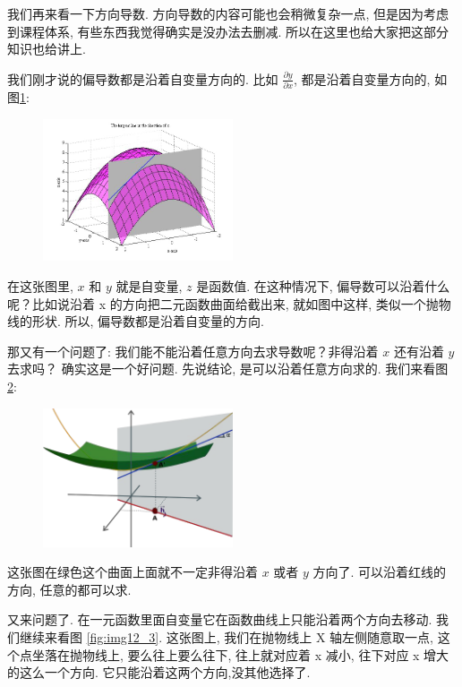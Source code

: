 我们再来看一下方向导数. 方向导数的内容可能也会稍微复杂一点, 但是因为考虑到课程体系, 有些东西我觉得确实是没办法去删减. 所以在这里也给大家把这部分知识也给讲上. 

我们刚才说的偏导数都是沿着自变量方向的. 比如 $\frac{\partial y}{\partial x}$, 都是沿着自变量方向的, 如图\ref{fig:img12_1}: 

\begin{figure}[ht]
  \centering
  \includegraphics[width=0.5\textwidth]{asset/20230901095029.png}
  \caption{}
  \label{fig:img12_1}
\end{figure}

在这张图里, $x$ 和 $y$ 就是自变量, $z$ 是函数值. 在这种情况下, 偏导数可以沿着什么呢？比如说沿着 x 的方向把二元函数曲面给截出来, 就如图中这样, 类似一个抛物线的形状. 所以, 偏导数都是沿着自变量的方向. 

那又有一个问题了: 我们能不能沿着任意方向去求导数呢？非得沿着 $x$ 还有沿着 $y$ 去求吗？ 确实这是一个好问题. 先说结论, 是可以沿着任意方向求的. 我们来看图 \ref{fig:img12_2}: 

\begin{figure}[ht]
  \centering
  \includegraphics[width=0.5\textwidth]{asset/20230901095643.png}
  \caption{}
  \label{fig:img12_2}
\end{figure}

这张图在绿色这个曲面上面就不一定非得沿着 $x$ 或者 $y$ 方向了. 可以沿着红线的方向, 任意的都可以求. 

又来问题了. 在一元函数里面自变量它在函数曲线上只能沿着两个方向去移动. 我们继续来看图 \ref{fig:img12_3}. 这张图上, 我们在抛物线上 X 轴左侧随意取一点, 这个点坐落在抛物线上, 要么往上要么往下, 往上就对应着 x 减小, 往下对应 x 增大的这么一个方向. 它只能沿着这两个方向,没其他选择了. 

